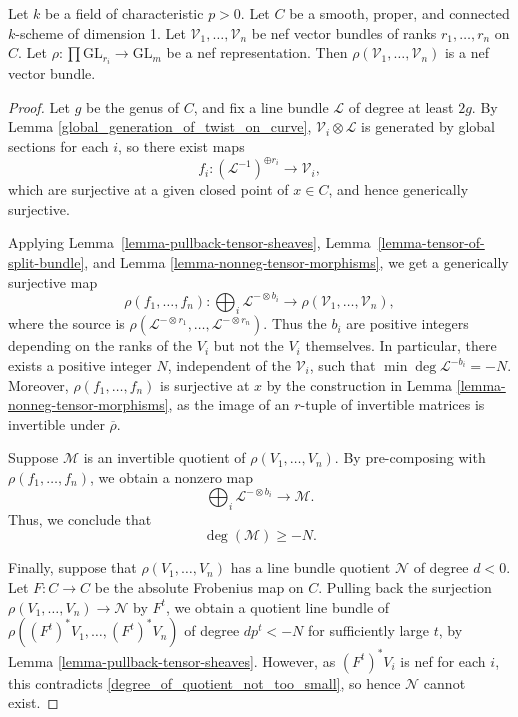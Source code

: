 \begin{lemma}\label{lemma-no-neg-quot-curves-p}
Let $k$ be a field of characteristic $p > 0$.
Let $C$ be a smooth, proper, and connected $k$-scheme of dimension 1.
Let $\mathcal{V}_1,\ldots,\mathcal{V}_n$ be nef vector bundles of
ranks $r_1,\ldots,r_n$ on $C$.
Let $\rho : \prod \mathrm{GL}_{r_i}\to \mathrm{GL}_m$ be a nef
representation.
Then $\rho(\mathcal{V}_1,\ldots,\mathcal{V}_n)$ is a nef vector bundle.
\end{lemma}
\begin{proof}
Let $g$ be the genus of $C$, and fix a line bundle $\mathcal{L}$ of degree at
least $2g$.
By Lemma \ref{global_generation_of_twist_on_curve},
$\mathcal{V}_i \otimes\mathcal{L}$ is generated by global sections for each
$i$, so there exist maps
$$
  f_i : (\mathcal{L}^{-1})^{\oplus r_i} \to \mathcal{V}_i,
$$
which are surjective at a given closed point of $x \in C$, and hence
generically surjective.

Applying
Lemma~\ref{lemma-pullback-tensor-sheaves},
Lemma~\ref{lemma-tensor-of-split-bundle}, and
Lemma \ref{lemma-nonneg-tensor-morphisms}, we get a generically surjective map
$$
  \rho(f_1,\ldots,f_n) :
    \bigoplus_i \mathcal{L}^{-\otimes b_i} \to
    \rho(\mathcal{V}_1,\ldots,\mathcal{V}_n),
$$
where the source is
$\rho(\mathcal{L}^{-\otimes r_1},\ldots,\mathcal{L}^{-\otimes r_n})$.
Thus the $b_i$ are positive integers depending on the ranks of the $V_i$ but
not the $V_i$ themselves.
In particular, there exists a positive integer $N$, independent of the
$\mathcal{V}_i$, such that $\min\deg\mathcal{L}^{-b_i} = -N$.
Moreover, $\rho(f_1,\ldots,f_n)$ is surjective at $x$ by the construction in
Lemma \ref{lemma-nonneg-tensor-morphisms}, as the image of an $r$-tuple of invertible
matrices is invertible under $\overline{\rho}$.

Suppose $\mathcal{M}$ is an invertible quotient of $\rho(V_1,\ldots,V_n)$.
By pre-composing with $\rho(f_1,\ldots,f_n)$, we obtain a nonzero map
$$
  \bigoplus_i \mathcal{L}^{-\otimes b_i} \to \mathcal{M}.
$$
Thus, we conclude that
\begin{equation}\label{degree_of_quotient_not_too_small}
  \deg(\mathcal{M}) \ge -N.
\end{equation}

Finally, suppose that $\rho(V_1,\ldots,V_n)$ has a line bundle quotient
$\mathcal{N}$ of degree $d < 0$.
Let $F : C \to C$ be the absolute Frobenius map on $C$.
Pulling back the surjection $\rho(V_1,\ldots,V_n) \to \mathcal{N}$ by $F^t$,
we obtain a quotient line bundle of
$\rho((F^t)^* V_1,\ldots,(F^t)^* V_n)$ of degree $dp^t < -N$ for sufficiently
large $t$, by Lemma \ref{lemma-pullback-tensor-sheaves}.
However, as $(F^{t})^*V_i$ is nef for each $i$, this contradicts
\eqref{degree_of_quotient_not_too_small}, so hence $\mathcal{N}$ cannot exist.
\end{proof}


